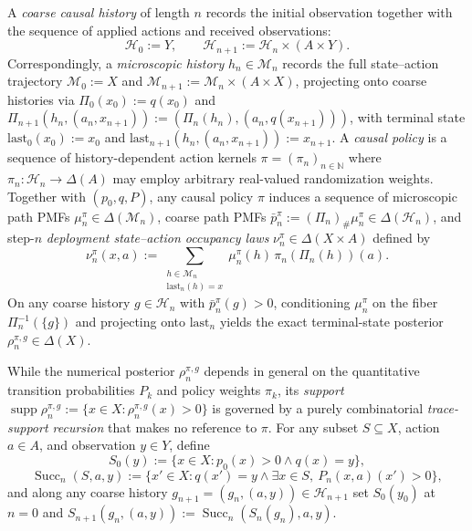 \documentclass[11pt,a4paper]{article}
\begin{document}
A \emph{coarse causal history} of length \(n\) records the initial
observation together with the sequence of applied actions and received
observations:
\[\mathcal{H}_0 := Y, \qquad \mathcal{H}_{n+1} := \mathcal{H}_n \times (A \times Y).\]
Correspondingly, a \emph{microscopic history} \(h_n \in \mathcal{M}_n\)
records the full state--action trajectory \(\mathcal{M}_0 := X\) and
\(\mathcal{M}_{n+1} := \mathcal{M}_n \times (A \times X)\), projecting
onto coarse histories via \(\Pi_0(x_0) := q(x_0)\) and
\(\Pi_{n+1}(h_n, (a_n, x_{n+1})) := (\Pi_n(h_n), (a_n, q(x_{n+1})))\),
with terminal state \(\mathrm{last}_0(x_0) := x_0\) and
\(\mathrm{last}_{n+1}(h_n, (a_n, x_{n+1})) := x_{n+1}\). A \emph{causal
policy} is a sequence of history-dependent action kernels
\(\pi = (\pi_n)_{n \in \mathbb{N}}\) where
\(\pi_n: \mathcal{H}_n \to \Delta(A)\) may employ arbitrary real-valued
randomization weights. Together with \((p_0, q, P)\), any causal policy
\(\pi\) induces a sequence of microscopic path PMFs
\(\mu_n^\pi \in \Delta(\mathcal{M}_n)\), coarse path PMFs
\(\bar{p}_n^\pi := (\Pi_n)_\# \mu_n^\pi \in \Delta(\mathcal{H}_n)\), and
step-\(n\) \emph{deployment state--action occupancy laws}
\(\nu_n^\pi \in \Delta(X \times A)\) defined by
\[\nu_n^\pi(x, a) := \sum_{\substack{h \in \mathcal{M}_n \\ \mathrm{last}_n(h) = x}} \mu_n^\pi(h)\, \pi_n(\Pi_n(h))(a).\]
On any coarse history \(g \in \mathcal{H}_n\) with
\(\bar{p}_n^\pi(g) > 0\), conditioning \(\mu_n^\pi\) on the fiber
\(\Pi_n^{-1}(\{g\})\) and projecting onto \(\mathrm{last}_n\) yields the
exact terminal-state posterior \(\rho_n^{\pi, g} \in \Delta(X)\).

While the numerical posterior \(\rho_n^{\pi, g}\) depends in general on
the quantitative transition probabilities \(P_k\) and policy weights
\(\pi_k\), its \emph{support}
\(\operatorname{supp}\rho_n^{\pi, g} := \{x \in X : \rho_n^{\pi, g}(x) > 0\}\)
is governed by a purely combinatorial \emph{trace-support recursion}
that makes no reference to \(\pi\). For any subset \(S \subseteq X\),
action \(a \in A\), and observation \(y \in Y\), define
\[S_0(y) := \{x \in X : p_0(x) > 0 \land q(x) = y\},\]
\[\operatorname{Succ}_n(S, a, y) := \{x' \in X : q(x') = y \land \exists x \in S,\ P_n(x,a)(x') > 0\},\]
and along any coarse history
\(g_{n+1} = (g_n, (a, y)) \in \mathcal{H}_{n+1}\) set \(S_0(y_0)\) at
\(n=0\) and
\(S_{n+1}(g_n, (a, y)) := \operatorname{Succ}_n(S_n(g_n), a, y)\).
\end{document}
